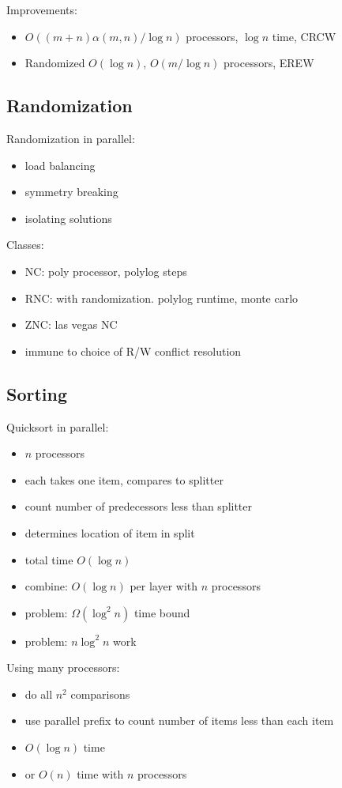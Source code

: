 \documentclass[12pt]{article}
\begin{document}
Improvements:
\begin{itemize}
\item $O((m+n)\alpha(m,n)/\log n)$ processors, $\log n$ time, CRCW
\item Randomized $O(\log n)$, $O(m/\log n)$ processors, EREW
\end{itemize}


\subsection{Randomization}


Randomization in parallel:
\begin{itemize}
\item load balancing
\item symmetry breaking
\item isolating solutions
\end{itemize}

Classes:
\begin{itemize}
\item NC: poly processor, polylog steps
\item RNC: with randomization.  polylog runtime, monte carlo
\item ZNC: las vegas NC
\item immune to choice of R/W conflict resolution
\end{itemize}

\subsection*{Sorting}

Quicksort in parallel:
\begin{itemize}
\item $n$ processors
\item each takes one item, compares to splitter
\item count number of predecessors less than splitter
\item determines location of item in split
\item total time $O(\log n)$
\item combine: $O(\log n)$ per layer with $n$ processors
\item problem: $\Omega(\log^2 n)$ time bound
\item problem: $n\log^2 n$ work
\end{itemize}

Using many processors:
\begin{itemize}
\item do all $n^2$ comparisons
\item use parallel prefix to count number of items less than each item
\item $O(\log n)$ time
\item or $O(n)$ time with $n$ processors
\end{itemize}
\end{document}
